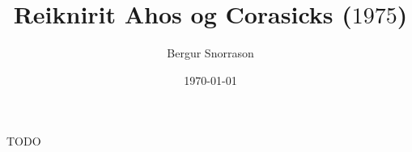 \title{Reiknirit Ahos og Corasicks ($1975$)}
\author{Bergur Snorrason}
\date{\today}



\frame{\titlepage}

{
	{
		\item<1-> TODO
	}
}

{
}

{
}


